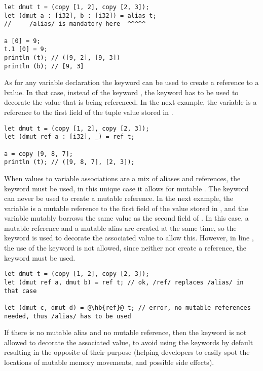 \begin{lstlisting}[style=coloredverbatim, escapechar=@]
let dmut t = (copy [1, 2], copy [2, 3]);
let (dmut a : [i32], b : [i32]) = alias t;
//     /alias/ is mandatory here  ^^^^^

a [0] = 9;
t.1 [0] = 9;
println (t); // ([9, 2], [9, 3])
println (b); // [9, 3]
\end{lstlisting}

As for any variable declaration the keyword  can be used to create a
reference to a lvalue. In that case, instead of the keyword \token{alias}, the
keyword \token{ref} has to be used to decorate the value that is being
referenced. In the next example, the variable \token{a} is a reference to the
first field of the tuple value stored in \token{t}.

\begin{lstlisting}[style=coloredverbatim, escapechar=@]
let dmut t = (copy [1, 2], copy [2, 3]);
let (dmut ref a : [i32], _) = ref t;

a = copy [9, 8, 7];
println (t); // ([9, 8, 7], [2, 3]);
\end{lstlisting}

When values to variable associations are a mix of aliases and references, the
keyword \token{ref} must be used, in this unique case it allows for mutable
. The \token{alias} keyword can never be used to create a mutable
reference. In the next example, the variable \token{a} is a mutable reference
to the first field of the value stored in , and the variable
\token{b} mutably borrows the same value as the second field of \token{t}. In
this case, a mutable reference and a mutable alias are created at the same time,
so the keyword  is used to decorate the associated value to allow
this. However, in line \token{4}, the use of the keyword \token{ref} is not
allowed, since neither \token{c} nor \token{d} create a reference, the keyword
\token{alias} must be used.

\begin{lstlisting}[style=coloredverbatim, escapechar=@]
let dmut t = (copy [1, 2], copy [2, 3]);
let (dmut ref a, dmut b) = ref t; // ok, /ref/ replaces /alias/ in that case

let (dmut c, dmut d) = @\hb{ref}@ t; // error, no mutable references needed, thus /alias/ has to be used
\end{lstlisting}

If there is no mutable alias and no mutable reference, then the keyword is not
allowed to decorate the associated value, to avoid using the keywords by default
resulting in the opposite of their purpose (helping developers to easily spot
the locations of mutable memory movements, and possible side effects).

